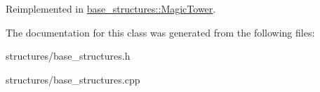 Reimplemented in \hyperlink{classbase__structures_1_1MagicTower_a8602aa6fe28a969230079369c4c71efc}{base\+\_\+structures\+::\+Magic\+Tower}.



The documentation for this class was generated from the following files\+:\begin{DoxyCompactItemize}
\item 
structures/base\+\_\+structures.\+h\item 
structures/base\+\_\+structures.\+cpp\end{DoxyCompactItemize}

